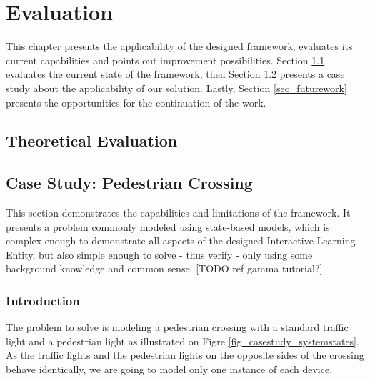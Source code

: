 \chapter{Evaluation}
This chapter presents the applicability of the designed framework, evaluates its current capabilities and points out improvement possibilities. Section \ref{sec_theoeval} evaluates the current state of the framework, then Section \ref{sec_casestudy} presents a case study about the applicability of our solution. Lastly, Section \ref{sec_futurework} presents the opportunities for the continuation of the work.

\section{Theoretical Evaluation} \label{sec_theoeval}

\clearpage
\section{Case Study: Pedestrian Crossing} \label{sec_casestudy}
This section demonstrates the capabilities and limitations of the framework. It presents a problem commonly modeled using state-based models, which is complex enough to demonstrate all aspects of the designed Interactive Learning Entity, but also simple enough to solve - thus verify - only using some background knowledge and common sense. [TODO ref gamma tutorial?]

\subsection{Introduction} \label{subs_casestudyintro}

The problem to solve is modeling a pedestrian crossing with a standard traffic light and a pedestrian light as illustrated on Figre \ref{fig_casestudy_systemstates}. As the traffic lights and the pedestrian lights on the opposite sides of the crossing behave identically, we are going to model only one instance of each device. 

